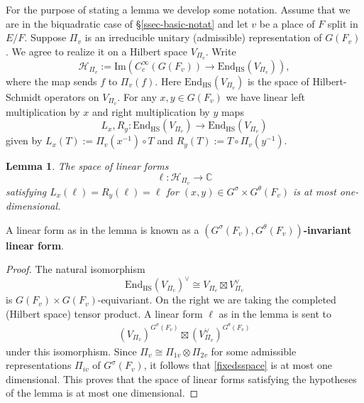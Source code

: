 \documentclass[12pt]{amsart}
\newtheorem{lem}[thm]{Lemma}
\theoremstyle{remark}
\numberwithin{equation}{section}
\newcommand{\lto}{\longrightarrow}
\newcommand{\CC}{\mathbb{C}}
\newcommand{\End}{\mathrm{End}}
\theoremstyle{definition}
\numberwithin{equation}{subsection}
\begin{document}
For the purpose of stating a lemma we develop some notation.  Assume that we are in the biquadratic case of \S \ref{ssec-basic-notat} and let $v$ be a place of $F$ split in $E/F$.
Suppose $\Pi_v$  is an irreducible unitary (admissible) representation of
$G(F_v)$.  We agree to realize it on a Hilbert space $V_{\Pi_v}$.  Write
$$
\mathcal{H}_{\Pi_{v}}:=\mathrm{Im}(C_c^{\infty}(G(F_v)) \to \mathrm{End}_{\mathrm{HS}}(V_{\Pi_{v}})),
$$
where the map sends $f$ to $\Pi_{v}(f)$.  Here $\mathrm{End}_{\mathrm{HS}}(V_{\Pi_{v}})$ is the space of Hilbert-Schmidt operators on $V_{\Pi_v}$. For any $x,y \in G(F_v)$ we have linear left multiplication by $x$ and right multiplication by $y$ maps
$$
L_x,R_y:\mathrm{End}_{\mathrm{HS}}(V_{\Pi_{v}}) \lto \mathrm{End}_{\mathrm{HS}}(V_{\Pi_{v}})
$$
given by $L_x(T):= \Pi_v(x^{-1}) \circ T$ and $R_y(T):=T \circ \Pi_v(y^{-1})$.

\begin{lem} \label{lem-lforms} The space of linear forms
$$
\ell:\mathcal{H}_{\Pi_{v}} \lto \CC
$$
satisfying $L_x(\ell)=R_y(\ell)=\ell$ for $(x,y) \in G^{\sigma} \times G^{\theta}(F_v)$ is at most one-dimensional.
\end{lem}
A linear form as in the lemma is known as a \textbf{$(G^{\sigma}(F_v),G^{\theta}(F_v))$-invariant linear form}.
\begin{proof}
The natural isomorphism
$$
\End_{\mathrm{HS}}(V_{\Pi_{v}})^{\vee} \cong V_{\Pi_{v}} \boxtimes V_{\Pi_{v}}^{\vee}
$$
is $G(F_v) \times G(F_v)$-equivariant.  On the right we are taking the completed (Hilbert space) tensor product.
A linear form $\ell$ as in the lemma is sent to
\begin{align} \label{fixedsspace}
 (V_{\Pi_{v}})^{G^{\sigma}(F_v) } \boxtimes (V_{\Pi_{v}}^{\vee})^{G^{\theta}(F_v)}
\end{align}
under this isomorphism.  Since $\Pi_{v} \cong \Pi_{1v} \otimes \Pi_{2v}$ for some
admissible representations $\Pi_{iv}$ of $G^{\sigma}(F_v)$, it follows that \eqref{fixedsspace} is at most one dimensional.
 This proves that the space of linear forms satisfying the hypotheses of the lemma is at most one dimensional.
\end{proof}
\end{document}
